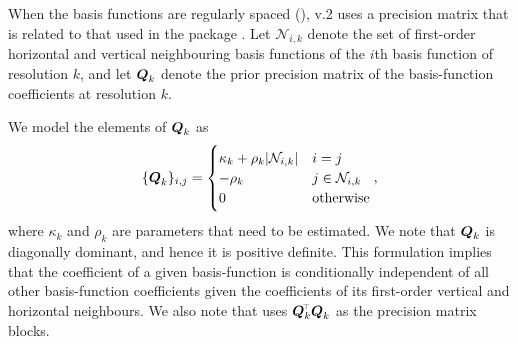 \documentclass[nojss]{jss}
\def\mbf#1{{%
\mathchoice%
{\hbox{\boldmath$\displaystyle{#1}$}}%
{\hbox{\boldmath$\textstyle{#1}$}}%
{\hbox{\boldmath$\scriptstyle{#1}$}}%
{\hbox{\boldmath$\scriptscriptstyle{#1}$}}%
}}
\def\vec{\mbf}
\newcommand{\tp}{{\!\scriptscriptstyle \top}}
\begin{document}
\begin{appendix}
When the basis functions are regularly spaced (),  v.2 uses a precision matrix that is related to that used in the  package  \citep{Nychka_2016_LatticeKrig}. 
 Let $\mathcal{N}_{i, k}$ denote the set of first-order horizontal and vertical neighbouring basis functions of the $i$th basis function of resolution $k$, 
 and let $\vec{Q}_k$ denote the prior precision matrix of the basis-function coefficients at resolution $k$. 

We model the elements of $\vec{Q}_k$ as
\begin{equation}\label{eqn:Q_k}
    \{\vec{Q}_{k}\}_{i, j}
=
\begin{cases}
\kappa_k + \rho_k |\mathcal{N}_{i, k}|   & i = j\\
-\rho_k & j \in \mathcal{N}_{i, k} \\
0 & \text{otherwise}
\end{cases},
\end{equation}
where $\kappa_k$ and $\rho_k$ are parameters that need to be estimated. 
We note that $\vec{Q}_k$ is diagonally dominant, and hence it is positive definite. 
 This formulation implies that the coefficient of a given basis-function is conditionally independent of all other basis-function coefficients given the coefficients of its first-order vertical and horizontal neighbours. 
 We also note that  uses $\vec{Q}_k^\tp\vec{Q}_k$ as the precision matrix blocks. 



\end{appendix}
\end{document}
